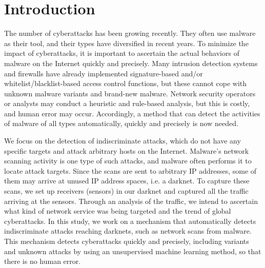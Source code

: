 \documentclass[conference]{IEEEtran}
\begin{document}
\section{Introduction}
The number of cyberattacks has been growing recently.
They often use malware as their tool, and their types have diversified in recent years.
To minimize the impact of cyberattacks, it is important to ascertain the actual behaviors of malware on the Internet quickly and precisely.
Many intrusion detection systems and firewalls have already implemented signature-based and/or whitelist/blacklist-based access control functions, but these cannot cope with unknown malware variants and brand-new malware.
Network security operators or analysts may conduct a heuristic and rule-based analysis, but this is costly, and human error may occur.
Accordingly, a method that can detect the activities of malware of all types automatically, quickly and precisely is now needed.

We focus on the detection of indiscriminate attacks, which do not have any specific targets and attack arbitrary hosts on the Internet.
Malware's network scanning activity is one type of such attacks, and malware often performs it to locate attack targets.
Since the scans are sent to arbitrary IP addresses, some of them may arrive at unused IP address spaces, i.e. a darknet.
To capture these scans, we set up receivers (sensors) in our darknet and captured all the traffic arriving at the sensors.
Through an analysis of the traffic, we intend to ascertain what kind of network service was being targeted and the trend of global cyberattacks.
In this study, we work on a mechanism that automatically detects indiscriminate attacks reaching darknets, such as network scans from malware.
This mechanism detects cyberattacks quickly and precisely, including variants and unknown attacks by using an unsupervised machine learning method, so that there is no human error.
\end{document}
